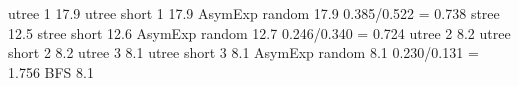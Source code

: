 \documentclass[a4paper,final,notitlepage,11pt,svgnames]{scrartcl}
\begin{document}
utree 1 17.9%
utree short 1 17.9%
AsymExp random 17.9%
0.385/0.522 = 0.738
stree 12.5%
stree short 12.6%
AsymExp random 12.7%
0.246/0.340 = 0.724
utree 2 8.2%
utree short 2 8.2%
utree 3 8.1%
utree short 3 8.1%
AsymExp random 8.1%
0.230/0.131 = 1.756
BFS 8.1%
\end{document}
